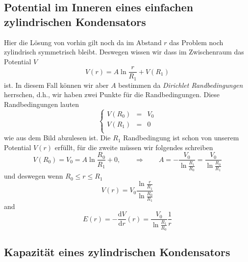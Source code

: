 \documentclass[A4paper, 12pt]{amsart}
\begin{document}
\subsection{Potential im Inneren eines einfachen zylindrischen Kondensators}

\begin{center}
  
\end{center}

Hier die Lösung von vorhin gilt noch da im Abstand
$ r $ das Problem noch zylindrisch symmetrisch bleibt.
Deswegen wissen wir dass im Zwischenraum das Potential $ V $
\begin{equation}
  V(r) =
  A \ln \frac{r}{R_{1}}
  +
  V(R_{1})
\end{equation}
ist.
In diesem Fall können wir aber $ A $ bestimmen da
\textit{Dirichlet Randbedingungen}
herrschen, d.h., wir haben zwei Punkte für die Randbedingungen.
Diese Randbedingungen lauten
%
\begin{equation*}
  \left\{
    \begin{matrix}
      V(R_{0}) & = & V_{0} \\
      V(R_{1}) & = & 0 \\
    \end{matrix}
  \right.
\end{equation*}
%
wie aus dem Bild abzulesen ist.
Die $ R_{1} $ Randbedingung ist schon von unserem Potential $ V(r) $ erfüllt,
für die zweite müssen wir folgendes schreiben
%
\begin{equation*}
  V(R_{0}) = V_{0} =
  A \ln \frac{R_{0}}{R_{1}}
  +
  0,
  \qquad \Rightarrow \qquad
  A =
  -
  \frac{V_{0}}{\ln \frac{R_{1}}{R_{0}}}
  =
  \frac{V_{0}}{\ln \frac{R_{0}}{R_{1}}}
\end{equation*}
%
und deswegen wenn $ R_{0} \leq r \leq R_{1} $
\begin{equation*}
  V(r) =
  V_{0}
  \frac{\ln \frac{r}{R_{1}}}{\ln \frac{R_{0}}{R_{1}}}
\end{equation*}
and
\begin{equation*}
  E(r) =
  - \frac{\mathrm{d}V}{\mathrm{d}r}(r)
  =
  \frac{V_{0}}{\ln \frac{R_{1}}{R_{0}}}
  \frac{1}{r}
\end{equation*}

\subsection{Kapazität eines zylindrischen Kondensators}
\end{document}
